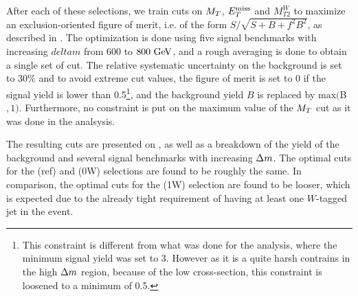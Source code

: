             After each of these selections, we train cuts on $M_T$, $E_T^\text{miss}$ and $M_{T2}^{W}$
            to maximize an exclusion-oriented figure of merit, i.e. of the form
            $S/\sqrt{S+B+f^2 B^2}$, as described in . The
            optimization is done using five signal benchmarks with increasing $deltam$ from
            $600$ to $800~\text{GeV}$, and a rough averaging is done to obtain a single set of cut.
            The relative systematic uncertainty on the background is set to 30\% and to avoid
            extreme cut values, the figure of merit is set to 0 if the signal yield is
            lower than 0.5\footnote{This constraint is different from what was done for
            the analysis, where the minimum signal yield was set to 3. However as it is
            a quite harsh contrains in the high $\Delta m$ region, because of the low
            cross-section, this constraint is loosened to a minimum of 0.5.}, and the
            background yield $B$ is replaced by $\text{max}($B$,1)$. Furthermore, no
            constraint is put on the maximum value of the $M_T$ cut as it was done in the
            analsysis.

            The resulting cuts are
            presented on , as well as a breakdown of the
            yield of the background and several signal benchmarks with increasing $\Delta m$.
            The optimal cuts for the (ref) and (0W) selections are found to be roughly
            the same. In comparison, the optimal cuts for the (1W) selection are found
            to be looser, which is expected due to the already tight requirement of having
            at least one $W$-tagged jet in the event.

